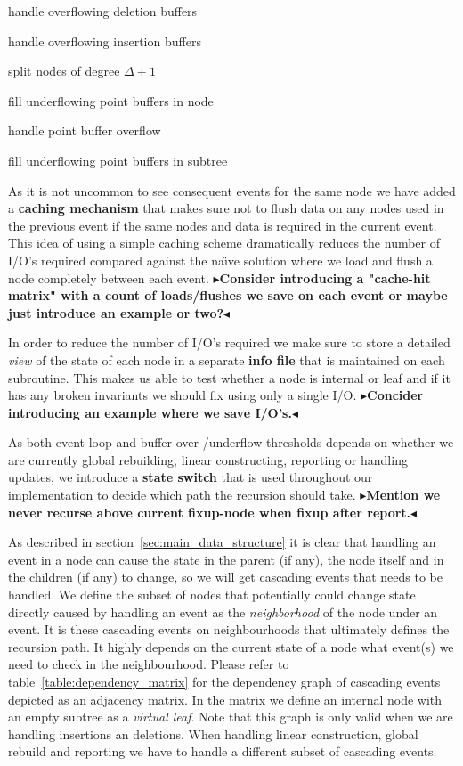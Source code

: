 \documentclass[twoside,11pt,openright]{report}
\newcommand{\todo}[1]{{\color[rgb]{.5,0,0}\textbf{$\blacktriangleright$#1$\blacktriangleleft$}}}
\begin{document}
\begin{inlinelist}
	\item handle overflowing deletion buffers
	\item handle overflowing insertion buffers
	\item split nodes of degree $\Delta+1$
	\item fill underflowing point buffers in node
	\item handle point buffer overflow
	\item fill underflowing point buffers in subtree
\end{inlinelist}

As it is not uncommon to see consequent events for the same node we have added a \textbf{caching mechanism} that makes sure not to flush data on any nodes used in the previous event if the same nodes and data is required in the current event. This idea of using a simple caching scheme dramatically reduces the number of I/O's required compared against the na\"{\i}ve solution where we load and flush a node completely between each event. \todo{Consider introducing a "cache-hit matrix" with a count of loads/flushes we save on each event or maybe just introduce an example or two?}

In order to reduce the number of I/O's required we make sure to store a detailed \textit{view} of the state of each node in a separate \textbf{info file} that is maintained on each subroutine. This makes us able to test whether a node is internal or leaf and if it has any broken invariants we should fix using only a single I/O. \todo{Concider introducing an example where we save I/O's.}

As both event loop and buffer over-/underflow thresholds depends on whether we are currently global rebuilding, linear constructing, reporting or handling updates, we introduce a \textbf{state switch} that is used throughout our implementation to decide which path the recursion should take. \todo{Mention we never recurse above current fixup-node when fixup after report.}

As described in section~\ref{sec:main_data_structure} it is clear that handling an event in a node can cause the state in the parent (if any), the node itself and in the children (if any) to change, so we will get cascading events that needs to be handled. We define the subset of nodes that potentially could change state directly caused by handling an event as the \textit{neighborhood} of the node under an event. It is these cascading events on neighbourhoods that ultimately defines the recursion path. It highly depends on the current state of a node what event(s) we need to check in the neighbourhood. Please refer to table~\ref{table:dependency_matrix} for the dependency graph of cascading events depicted as an adjacency matrix. In the matrix we define an internal node with an empty subtree as a \textit{virtual leaf}. Note that this graph is only valid when we are handling insertions an deletions. When handling linear construction, global rebuild and reporting we have to handle a different subset of cascading events.
\end{document}
